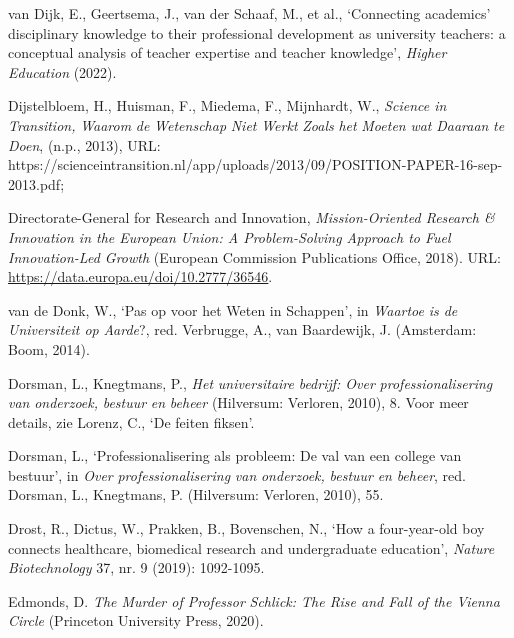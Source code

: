 \documentclass[smallauthor, chapterhaspagenum, nochapterinheader, pagenuminheader,  bigchapnum,medium2, tocpages, garamond, titleinheader]{jote-book}
\begin{document}
\begin{references}
		van Dijk, E., Geertsema, J., van der Schaaf, M., et al., ‘Connecting academics' disciplinary knowledge to their professional development as university teachers: a conceptual analysis of teacher expertise and teacher knowledge', \emph{Higher Education} (2022).



		Dijstelbloem, H., Huisman, F., Miedema, F., Mijnhardt, W., \emph{Science in Transition, }\emph{Waarom}\emph{ de }\emph{Wetenschap}\emph{ }\emph{Niet}\emph{ }\emph{Werkt}\emph{ }\emph{Zoals}\emph{ het }\emph{Moeten}\emph{ wat }\emph{Daaraan}\emph{ }\emph{te}\emph{ }\emph{Doen}, (n.p., 2013), URL: https://scienceintransition.nl/app/uploads/2013/09/POSITION-PAPER-16-sep-2013.pdf;



		Directorate-General for Research and Innovation, \emph{Mission-Oriented Research \& Innovation in the European Union: A Problem-Solving Approach to Fuel Innovation-Led Growth} (European Commission Publications Office, 2018). URL: \href{https://data.europa.eu/doi/10.2777/36546}{https://data.europa.eu/doi/10.2777/36546}.



		van de Donk, W., ‘Pas op voor het Weten in Schappen', in \emph{Waartoe}\emph{ is de Universiteit op }\emph{Aarde}?, red. Verbrugge, A., van Baardewijk, J. (Amsterdam: Boom, 2014).



		Dorsman, L., Knegtmans, P., \emph{Het }\emph{universitaire}\emph{ }\emph{bedrijf}\emph{: Over }\emph{professionalisering}\emph{ van }\emph{onderzoek}\emph{, }\emph{bestuur}\emph{ }\emph{en}\emph{ }\emph{beheer} (Hilversum: Verloren, 2010), 8. Voor meer details, zie Lorenz, C., ‘De feiten fiksen'.



		Dorsman, L., ‘Professionalisering als probleem: De val van een college van bestuur', in \emph{Over }\emph{professionalisering}\emph{ van }\emph{onderzoek}\emph{, }\emph{bestuur}\emph{ }\emph{en}\emph{ }\emph{beheer}, red. Dorsman, L., Knegtmans, P. (Hilversum: Verloren, 2010), 55.



		Drost, R., Dictus, W., Prakken, B., Bovenschen, N., ‘How a four-year-old boy connects healthcare, biomedical research and undergraduate education', \emph{Nature Biotechnology} 37, nr. 9 (2019): 1092-1095.



		Edmonds, D. \emph{The Murder of Professor }\emph{Schlick}\emph{: The Rise and Fall of the Vienna Circle} (Princeton University Press, 2020).




\end{references}
\end{document}
